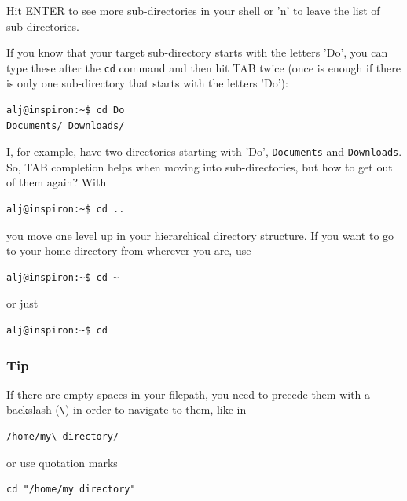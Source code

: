 \documentclass[11pt]{article}
\begin{document}
Hit ENTER to see more sub-directories in your shell or 'n' to leave the
list of sub-directories.

If you know that your target sub-directory starts with the letters
'Do', you can type these after the \texttt{cd} command and then hit TAB twice
(once is enough if there is only one sub-directory that starts with the
letters 'Do'):

\begin{verbatim}
alj@inspiron:~$ cd Do
Documents/ Downloads/
\end{verbatim}

I, for example, have two directories starting with 'Do', \texttt{Documents}
and \texttt{Downloads}. So, TAB completion helps when moving into
sub-directories, but how to get out of them again? With

\begin{verbatim}
alj@inspiron:~$ cd ..
\end{verbatim}

you move one level up in your hierarchical directory structure.  If
you want to go to your home directory from wherever you are, use

\begin{verbatim}
alj@inspiron:~$ cd ~
\end{verbatim}

or just

\begin{verbatim}
alj@inspiron:~$ cd
\end{verbatim}

\subsubsection{Tip}
\label{sec:orgheadline5}
If there are empty spaces in your filepath, you need to precede them
with a backslash (\texttt{\textbackslash{}}) in order to navigate to them, like in 

\begin{verbatim}
/home/my\ directory/
\end{verbatim}

or use quotation marks

\begin{verbatim}
cd "/home/my directory"
\end{verbatim}
\end{document}
